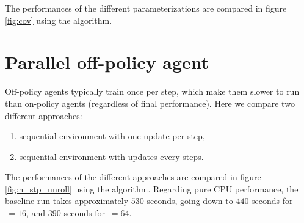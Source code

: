 The performances of the different parameterizations are compared in figure \ref{fig:cov} using the \ppo algorithm.



\section{Parallel off-policy agent}

Off-policy agents typically train once per step, which make them slower to run than on-policy agents (regardless of final performance). Here we  compare two different approaches:

\begin{enumerate}
	\item sequential environment with one update per step,
	\item sequential environment with  updates every  steps.
\end{enumerate}

The performances of the different approaches are compared in figure \ref{fig:n_stp_unroll} using the \tdt algorithm. Regarding pure CPU performance, the baseline run takes approximately $530$ seconds, going down to $440$ seconds for $\, = 16$, and $390$ seconds for $\, = 64$.



